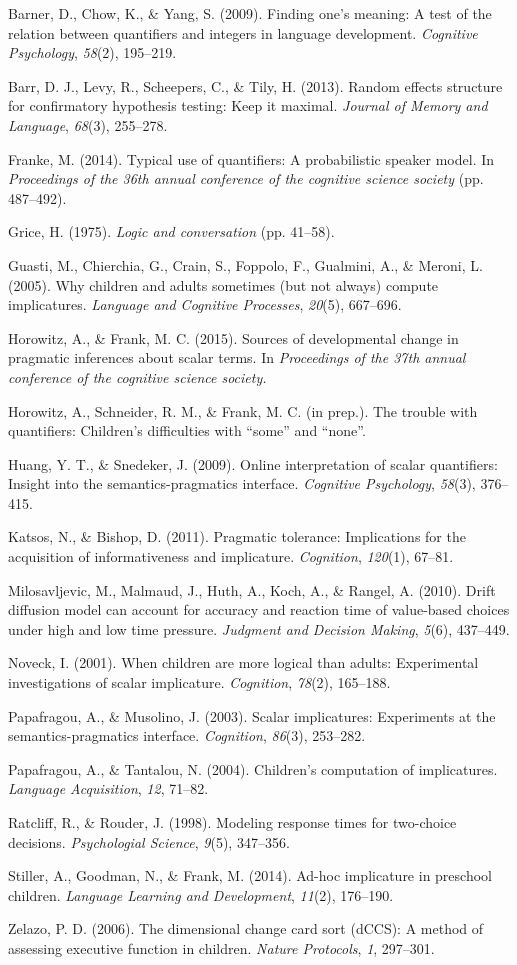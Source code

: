 \documentclass[10pt, letterpaper]{article}
\begin{document}
Barner, D., Chow, K., \& Yang, S. (2009). Finding one's meaning: A test
of the relation between quantifiers and integers in language
development. \emph{Cognitive Psychology}, \emph{58}(2), 195--219.

Barr, D. J., Levy, R., Scheepers, C., \& Tily, H. (2013). Random effects
structure for confirmatory hypothesis testing: Keep it maximal.
\emph{Journal of Memory and Language}, \emph{68}(3), 255--278.

Franke, M. (2014). Typical use of quantifiers: A probabilistic speaker
model. In \emph{Proceedings of the 36th annual conference of the
cognitive science society} (pp. 487--492).

Grice, H. (1975). \emph{Logic and conversation} (pp. 41--58).

Guasti, M., Chierchia, G., Crain, S., Foppolo, F., Gualmini, A., \&
Meroni, L. (2005). Why children and adults sometimes (but not always)
compute implicatures. \emph{Language and Cognitive Processes},
\emph{20}(5), 667--696.

Horowitz, A., \& Frank, M. C. (2015). Sources of developmental change in
pragmatic inferences about scalar terms. In \emph{Proceedings of the
37th annual conference of the cognitive science society.}

Horowitz, A., Schneider, R. M., \& Frank, M. C. (in prep.). The trouble
with quantifiers: Children's difficulties with ``some'' and ``none''.

Huang, Y. T., \& Snedeker, J. (2009). Online interpretation of scalar
quantifiers: Insight into the semantics-pragmatics interface.
\emph{Cognitive Psychology}, \emph{58}(3), 376--415.

Katsos, N., \& Bishop, D. (2011). Pragmatic tolerance: Implications for
the acquisition of informativeness and implicature. \emph{Cognition},
\emph{120}(1), 67--81.

Milosavljevic, M., Malmaud, J., Huth, A., Koch, A., \& Rangel, A.
(2010). Drift diffusion model can account for accuracy and reaction time
of value-based choices under high and low time pressure. \emph{Judgment
and Decision Making}, \emph{5}(6), 437--449.

Noveck, I. (2001). When children are more logical than adults:
Experimental investigations of scalar implicature. \emph{Cognition},
\emph{78}(2), 165--188.

Papafragou, A., \& Musolino, J. (2003). Scalar implicatures: Experiments
at the semantics-pragmatics interface. \emph{Cognition}, \emph{86}(3),
253--282.

Papafragou, A., \& Tantalou, N. (2004). Children's computation of
implicatures. \emph{Language Acquisition}, \emph{12}, 71--82.

Ratcliff, R., \& Rouder, J. (1998). Modeling response times for
two-choice decisions. \emph{Psychologial Science}, \emph{9}(5),
347--356.

Stiller, A., Goodman, N., \& Frank, M. (2014). Ad-hoc implicature in
preschool children. \emph{Language Learning and Development},
\emph{11}(2), 176--190.

Zelazo, P. D. (2006). The dimensional change card sort (dCCS): A method
of assessing executive function in children. \emph{Nature Protocols},
\emph{1}, 297--301.
\end{document}
